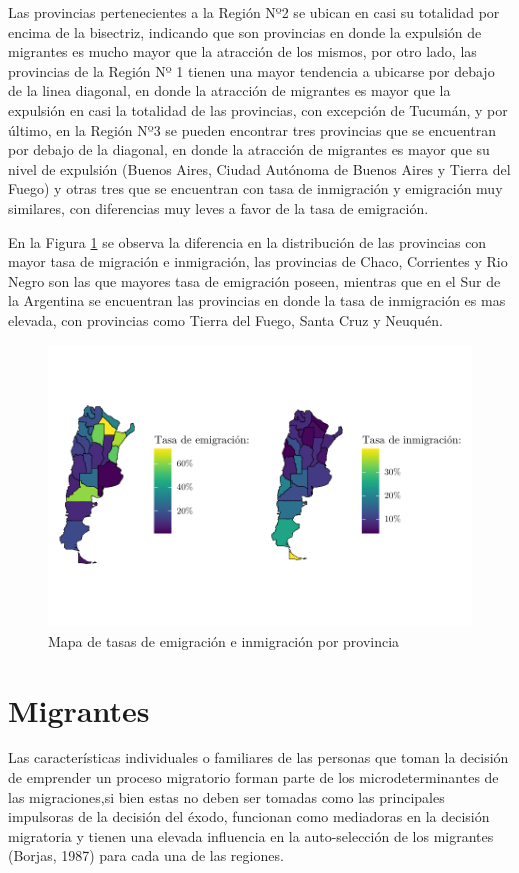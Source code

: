 \documentclass[12pt,a4paper]{article}
\begin{document}
Las provincias pertenecientes a la Región Nº2 se ubican en casi su totalidad por encima de la bisectriz, indicando que son provincias en donde la expulsión de migrantes es mucho mayor que la atracción de los mismos, por otro lado, las provincias de la Región Nº 1 tienen una mayor tendencia a ubicarse por debajo de la linea diagonal, en donde la atracción de migrantes es mayor que la expulsión en casi la totalidad de las provincias, con excepción de Tucumán, y por último, en la Región Nº3 se pueden encontrar tres provincias que se encuentran por debajo de la diagonal, en donde la atracción de migrantes es mayor que su nivel de expulsión (Buenos Aires, Ciudad Autónoma de Buenos Aires y Tierra del Fuego) y otras tres que se encuentran con tasa de inmigración y emigración muy similares, con diferencias muy leves a favor de la tasa de emigración.

En la Figura \ref{figure:emig_inmig_prov_mapa} se observa la diferencia en la distribución de las provincias con mayor tasa de migración e inmigración, las provincias de Chaco, Corrientes y Rio Negro son las que mayores tasa de emigración poseen, mientras que en el Sur de la Argentina se encuentran las provincias en donde la tasa de inmigración es mas elevada, con provincias como Tierra del Fuego, Santa Cruz y Neuquén.
\begin{figure}[h!]
\begin{center}
\includegraphics[scale=1.1]{./graficos/emig_inmig_por_prov.pdf}
\caption{Mapa de tasas de emigración e inmigración por provincia}
\label{figure:emig_inmig_prov_mapa}
\end{center}
\end{figure}
\newpage
\section{Migrantes}
Las características individuales o familiares de las personas que toman la decisión de emprender un proceso migratorio forman parte de los microdeterminantes de las migraciones,si bien estas no deben ser tomadas como las principales impulsoras de la decisión del éxodo, funcionan como mediadoras en la decisión migratoria y tienen una elevada influencia en la auto-selección de los migrantes (Borjas, 1987) para cada una de las regiones.
\end{document}
